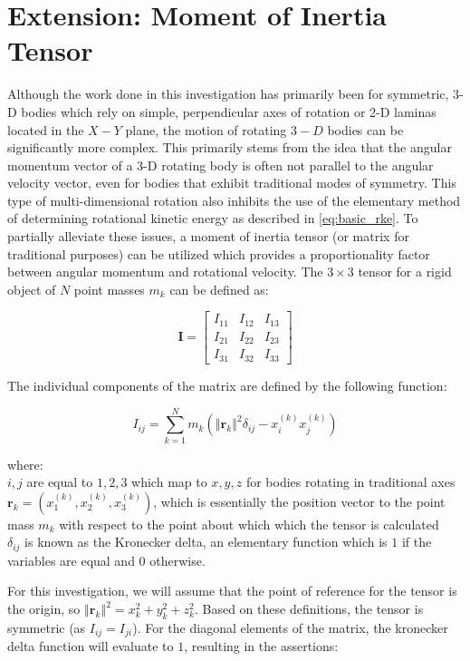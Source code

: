\section{Extension: Moment of Inertia Tensor}

Although the work done in this investigation has primarily been for symmetric, 3-D bodies which rely on simple, perpendicular axes of rotation or 2-D laminas located in the $X-Y$ plane, the motion of rotating $3-D$ bodies can be significantly more complex. This primarily stems from the idea that the angular momentum vector of a 3-D rotating body is often not parallel to the angular velocity vector, even for bodies that exhibit traditional modes of symmetry. This type of multi-dimensional rotation also inhibits the use of the elementary method of determining rotational kinetic energy as described in \cref{eq:basic_rke}. To partially alleviate these issues, a moment of inertia tensor (or matrix for traditional purposes) can be utilized which provides a proportionality factor between angular momentum and rotational velocity. The $3 \times 3$ tensor for a rigid object of $N$ point masses $m_k$ can be defined as:

\[\bm{I} = \begin{bmatrix}I_{11} & I_{12} & I_{13} \\ I_{21} & I_{22} & I_{23} \\ I_{31} & I_{32} & I_{33}\end{bmatrix}\]

The individual components of the matrix are defined by the following function:

\[I_{ij} = \sum_{k=1}^N m_k (\left\Vert \bm{r}_k \right\Vert^2\delta_{ij} - x_i^{(k)}x_j^{(k)})\]

where: \\

$i, j$ are equal to $1, 2, 3$ which map to $x, y, z$ for bodies rotating in traditional axes \\
$\bm{r}_k = (x_1^{(k)}, x_2^{(k)}, x_3^{(k)})$, which is essentially the position vector to the point mass $m_k$ with respect to the point about which which the tensor is calculated \\
$\delta_{ij}$ is known as the Kronecker delta, an elementary function which is $1$ if the variables are equal and $0$ otherwise.

For this investigation, we will assume that the point of reference for the tensor is the origin, so $\left\Vert \bm{r}_k \right\Vert^2 = x_k^2 + y_k^2 + z_k^2$. Based on these definitions, the tensor is symmetric (as $I_{ij} = I_{ji}$). For the diagonal elements of the matrix, the kronecker delta function will evaluate to $1$, resulting in the assertions:

